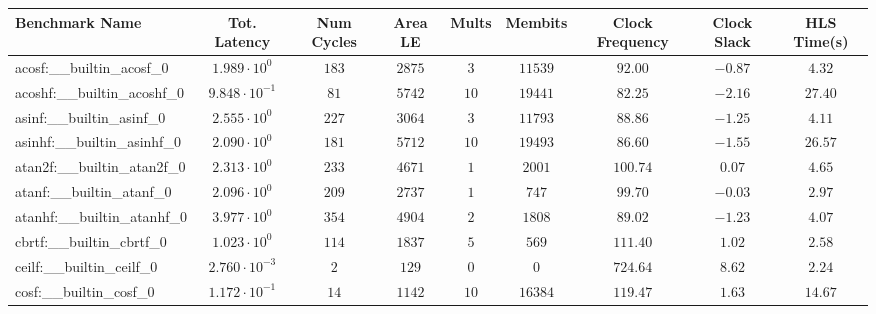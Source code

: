 \begin{tabular}{|l|c|c|c|c|c|c|c|c|}
\hline
Benchmark Name                            & Tot. Latency            & Num Cycles & Area LE   & Mults   & Membits    & Clock Frequency & Clock Slack & HLS Time(s) \\
\hline
acosf:\_\_builtin\_acosf\_0               & $ 1.989 \cdot 10^{0}  $ & $ 183    $ & $ 2875  $ & $ 3   $ & $ 11539  $ & $ 92.00       $ & $ -0.87   $ & $ 4.32    $ \\
acoshf:\_\_builtin\_acoshf\_0             & $ 9.848 \cdot 10^{-1} $ & $ 81     $ & $ 5742  $ & $ 10  $ & $ 19441  $ & $ 82.25       $ & $ -2.16   $ & $ 27.40   $ \\
asinf:\_\_builtin\_asinf\_0               & $ 2.555 \cdot 10^{0}  $ & $ 227    $ & $ 3064  $ & $ 3   $ & $ 11793  $ & $ 88.86       $ & $ -1.25   $ & $ 4.11    $ \\
asinhf:\_\_builtin\_asinhf\_0             & $ 2.090 \cdot 10^{0}  $ & $ 181    $ & $ 5712  $ & $ 10  $ & $ 19493  $ & $ 86.60       $ & $ -1.55   $ & $ 26.57   $ \\
atan2f:\_\_builtin\_atan2f\_0             & $ 2.313 \cdot 10^{0}  $ & $ 233    $ & $ 4671  $ & $ 1   $ & $ 2001   $ & $ 100.74      $ & $ 0.07    $ & $ 4.65    $ \\
atanf:\_\_builtin\_atanf\_0               & $ 2.096 \cdot 10^{0}  $ & $ 209    $ & $ 2737  $ & $ 1   $ & $ 747    $ & $ 99.70       $ & $ -0.03   $ & $ 2.97    $ \\
atanhf:\_\_builtin\_atanhf\_0             & $ 3.977 \cdot 10^{0}  $ & $ 354    $ & $ 4904  $ & $ 2   $ & $ 1808   $ & $ 89.02       $ & $ -1.23   $ & $ 4.07    $ \\
cbrtf:\_\_builtin\_cbrtf\_0               & $ 1.023 \cdot 10^{0}  $ & $ 114    $ & $ 1837  $ & $ 5   $ & $ 569    $ & $ 111.40      $ & $ 1.02    $ & $ 2.58    $ \\
ceilf:\_\_builtin\_ceilf\_0               & $ 2.760 \cdot 10^{-3} $ & $ 2      $ & $ 129   $ & $ 0   $ & $ 0      $ & $ 724.64      $ & $ 8.62    $ & $ 2.24    $ \\
cosf:\_\_builtin\_cosf\_0                 & $ 1.172 \cdot 10^{-1} $ & $ 14     $ & $ 1142  $ & $ 10  $ & $ 16384  $ & $ 119.47      $ & $ 1.63    $ & $ 14.67   $ \\

\end{tabular}
